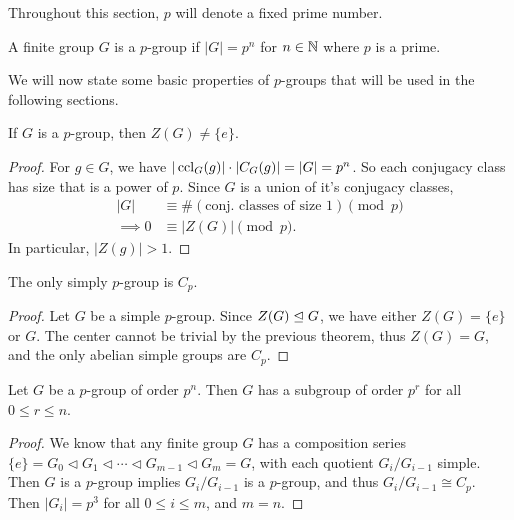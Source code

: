 \documentclass[a4paper]{scrreprt}
\begin{document}

Throughout this section, $p$ will denote a fixed prime number.

\begin{definition}[$p$-group]
	A finite group $G$ is a $p$-group if $|G| = p^n$ for $n \in \mathbb{N}$ where $p$ is a prime.
\end{definition}


We will now state some basic properties of $p$-groups that will be used in the following sections.

\begin{theorem}
	If $G$ is a $p$-group, then $Z(G) \neq \{e\}$.
\end{theorem}
\begin{proof}
	For $g \in G$, we have $|\operatorname{ccl}_G(g)| \cdot |C_G(g)| = |G| = p^n$. So each conjugacy class has size that is a power of $p$. 
	Since $G$ is a union of it's conjugacy classes, 
	\begin{align*}
		|G| &\equiv \#(\text{conj. classes of size 1}) \pmod{p}  \\
\implies 0 &\equiv |Z(G)| \pmod{p}.
	\end{align*}
	In particular, $|Z(g)| > 1$.
\end{proof}

\begin{corollary}
	The only simply $p$-group is $C_p$.
\end{corollary}
\begin{proof}
	Let $G$ be a simple $p$-group. Since $Z(G) \trianglelefteq G$, we have either $Z(G) = \{e\}$ or $G$. The center cannot be trivial by the previous theorem, thus $Z(G) = G$, and the only abelian simple groups are $C_p$.
\end{proof}

\begin{corollary}
	Let $G$ be a $p$-group of order $p^n$. Then $G$ has a subgroup of order $p^r$ for all $0 \leq r \leq n$.
\end{corollary}
\begin{proof}
	We know that any finite group $G$ has a composition series $\{e\} = G_0 \triangleleft G_1 \triangleleft \cdots \triangleleft G_{m - 1} \triangleleft G_m = G$, with each quotient $G_i / G_{i - 1}$ simple. Then $G$ is a $p$-group implies $G_i/G_{i - 1}$ is a $p$-group, and thus $G_i/G_{i - 1} \cong C_p$. Then $|G_i| = p^3$ for all $0 \leq i \leq m$, and $m = n$. 
\end{proof}
\end{document}
